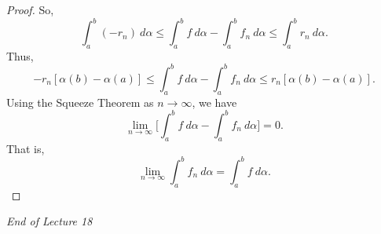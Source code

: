 \begin{proof}
    So, 
    \[  \int_{ a }^{ b } (-{r}_{n})  \ d \alpha \leq \int_{ a }^{ b }  f  \ d \alpha - \int_{ a }^{ b }  {f}_{n} \ d \alpha \leq \int_{ a }^{ b }  {r}_{n} \ d \alpha. \]
    Thus, 
    \[  - {r}_{n} [\alpha(b) - \alpha(a)] \leq \int_{ a }^{ b }  f  \ d \alpha - \int_{ a }^{ b }  {f}_{n}  \ d \alpha \leq {r}_{n} [\alpha(b) - \alpha(a)]. \]
    Using the Squeeze Theorem as \( n \to \infty   \), we have
    \[  \lim_{ n \to \infty  }  \Big[ \int_{ a }^{ b }  f  \ d \alpha - \int_{ a }^{ b }  {f}_{n} \ d \alpha \Big] = 0.  \]
    That is, 
    \[ \lim_{ n \to \infty   } \int_{ a }^{ b }  {f}_{n} \ d \alpha = \int_{ a }^{ b }  f  \ d \alpha. \]
    \[   \]
\end{proof}



\begin{center}
    \textit{End of Lecture 18} 
\end{center}
